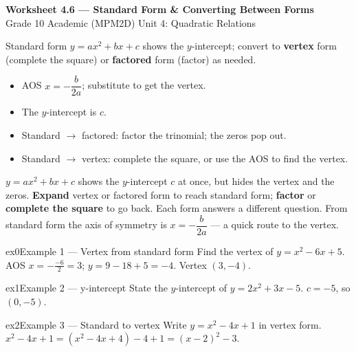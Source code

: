 \documentclass[11pt]{article}
\begin{document}
\begin{center}
{\LARGE\bfseries\color{titleblue}Worksheet 4.6 --- Standard Form \& Converting Between Forms}\\[2pt]
{\small Grade 10 Academic (MPM2D) \textperiodcentered{} Unit 4: Quadratic Relations}
\end{center}

\begin{ideabox}
Standard form $y=ax^2+bx+c$ shows the $y$-intercept; convert to \textbf{vertex} form (complete the square) or \textbf{factored} form (factor) as needed.
\begin{itemize}[leftmargin=*,itemsep=2pt]
  \item AOS $x=-\dfrac{b}{2a}$; substitute to get the vertex.
  \item The $y$-intercept is $c$.
  \item Standard $\to$ factored: factor the trinomial; the zeros pop out.
  \item Standard $\to$ vertex: complete the square, or use the AOS to find the vertex.
\end{itemize}
\end{ideabox}

\begin{learnbox}
$y=ax^2+bx+c$ shows the $y$-intercept $c$ at once, but hides the vertex and the zeros.
\textbf{Expand} vertex or factored form to reach standard form; \textbf{factor} or \textbf{complete the square} to go back. Each form answers a different question.
From standard form the axis of symmetry is $x=-\dfrac{b}{2a}$ — a quick route to the vertex.
\end{learnbox}


\begin{example}{ex0}{Example 1 --- Vertex from standard form}
Find the vertex of $y=x^2-6x+5$.
\soln AOS $x=-\tfrac{-6}{2}=3$; $y=9-18+5=-4$. Vertex $(3,-4)$.
\end{example}

\begin{example}{ex1}{Example 2 --- y-intercept}
State the $y$-intercept of $y=2x^2+3x-5$.
\soln $c=-5$, so $(0,-5)$.
\end{example}

\begin{example}{ex2}{Example 3 --- Standard to vertex}
Write $y=x^2-4x+1$ in vertex form.
\soln $x^2-4x+1=(x^2-4x+4)-4+1=(x-2)^2-3.$
\end{example}
\end{document}

